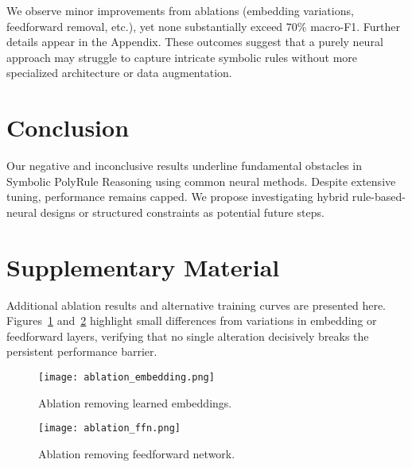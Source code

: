 We observe minor improvements from ablations (embedding variations, feedforward removal, etc.), yet none substantially exceed 70\% macro-F1. Further details appear in the Appendix. These outcomes suggest that a purely neural approach may struggle to capture intricate symbolic rules without more specialized architecture or data augmentation.

\section{Conclusion}
Our negative and inconclusive results underline fundamental obstacles in Symbolic PolyRule Reasoning using common neural methods. Despite extensive tuning, performance remains capped. We propose investigating hybrid rule-based-neural designs or structured constraints as potential future steps.

{\small


}

\clearpage
\appendix
\section{Supplementary Material}
Additional ablation results and alternative training curves are presented here. Figures~\ref{fig:ablation_embedding} and~\ref{fig:ablation_ffn} highlight small differences from variations in embedding or feedforward layers, verifying that no single alteration decisively breaks the persistent performance barrier.

\begin{figure}[!ht]
\centering
\texttt{[image: ablation\_embedding.png]}
\caption{Ablation removing learned embeddings.}
\label{fig:ablation_embedding}
\end{figure}

\begin{figure}[!ht]
\centering
\texttt{[image: ablation\_ffn.png]}
\caption{Ablation removing feedforward network.}
\label{fig:ablation_ffn}
\end{figure}

